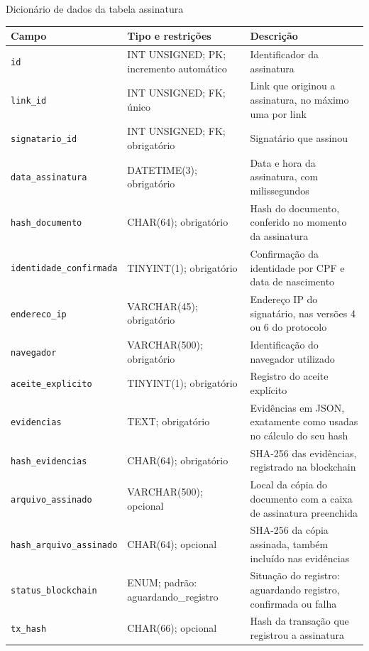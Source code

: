 \documentclass[
    12pt,
    a4paper,
    oneside,
    chapter=TITLE,
    section=TITLE,
    subsection=TITLE,
    subsubsection=TITLE,
    sumario=tradicional,
    english,
    brazil
]{abntex2}
\newcommand{\elem}[1]{\texttt{#1}}
\begin{document}
\begin{quadro}[H]
    \caption{Dicionário de dados da tabela assinatura}
    \label{quadro:dic-assinatura}
    \centering
    \footnotesize
    \begin{tabular}{L{4.5cm}L{3.6cm}L{6.3cm}}
        \toprule
        \textbf{Campo} & \textbf{Tipo e restrições} & \textbf{Descrição} \\
        \midrule
        \elem{id} & INT UNSIGNED; PK; incremento automático & Identificador da assinatura \\
        \elem{link\_id} & INT UNSIGNED; FK; único & Link que originou a assinatura, no máximo uma por link \\
        \elem{signatario\_id} & INT UNSIGNED; FK; obrigatório & Signatário que assinou \\
        \elem{data\_assinatura} & DATETIME(3); obrigatório & Data e hora da assinatura, com milissegundos \\
        \elem{hash\_documento} & CHAR(64); obrigatório & Hash do documento, conferido no momento da assinatura \\
        \elem{identidade\_confirmada} & TINYINT(1); obrigatório & Confirmação da identidade por CPF e data de nascimento \\
        \elem{endereco\_ip} & VARCHAR(45); obrigatório & Endereço IP do signatário, nas versões 4 ou 6 do protocolo \\
        \elem{navegador} & VARCHAR(500); obrigatório & Identificação do navegador utilizado \\
        \elem{aceite\_explicito} & TINYINT(1); obrigatório & Registro do aceite explícito \\
        \elem{evidencias} & TEXT; obrigatório & Evidências em JSON, exatamente como usadas no cálculo do seu hash \\
        \elem{hash\_evidencias} & CHAR(64); obrigatório & SHA-256 das evidências, registrado na blockchain \\
        \elem{arquivo\_assinado} & VARCHAR(500); opcional & Local da cópia do documento com a caixa de assinatura preenchida \\
        \elem{hash\_arquivo\_assinado} & CHAR(64); opcional & SHA-256 da cópia assinada, também incluído nas evidências \\
        \elem{status\_blockchain} & ENUM; padrão: aguardando\_registro & Situação do registro: aguardando registro, confirmada ou falha \\
        \elem{tx\_hash} & CHAR(66); opcional & Hash da transação que registrou a assinatura \\

\end{tabular}
\end{quadro}
\end{document}
